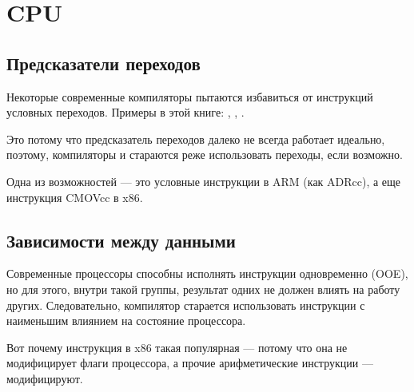 ﻿\chapter{CPU}

\section{Предсказатели переходов}
\label{branch_predictors}

Некоторые современные компиляторы пытаются избавиться от инструкций условных переходов.
Примеры в этой книге: , , .

Это потому что предсказатель переходов далеко не всегда работает идеально, поэтому, компиляторы и стараются
реже использовать переходы, если возможно.

Одна из возможностей --- это условные инструкции в ARM (как ADRcc), а еще инструкция CMOVcc в x86.

\section{Зависимости между данными}

Современные процессоры способны исполнять инструкции одновременно (\ac{OOE}), но для этого,
внутри такой группы, результат одних не должен влиять на работу других.
Следовательно, компилятор старается использовать инструкции с наименьшим влиянием на состояние процессора.

Вот почему инструкция \LEA в x86 такая популярная --- 
потому что она не модифицирует флаги процессора,
а прочие арифметические инструкции --- модифицируют.

